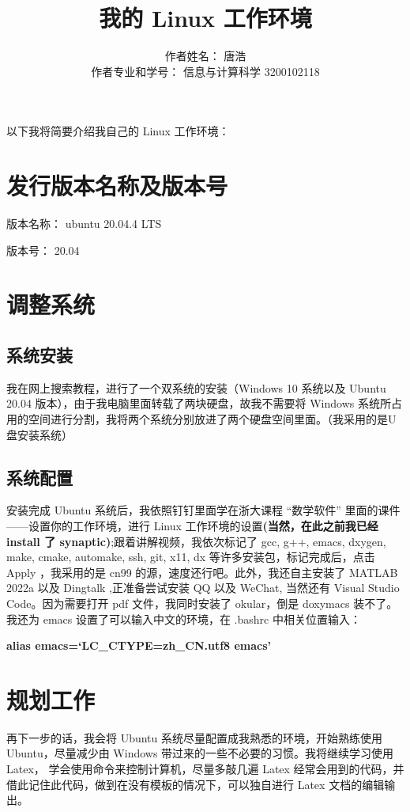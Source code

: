 \documentclass{ctexart}
\title{我的 Linux 工作环境}
\author{作者姓名： 唐浩 \\ 作者专业和学号： 信息与计算科学 3200102118}
\begin{document}
\maketitle

以下我将简要介绍我自己的 Linux 工作环境：

\section{发行版本名称及版本号}

版本名称： ubuntu 20.04.4 LTS

版本号： 20.04

\section{调整系统}

\subsection{系统安装}

我在网上搜索教程，进行了一个双系统的安装（Windows 10 系统以及 Ubuntu 20.04 版本），由于我电脑里面转载了两块硬盘，故我不需要将 Windows 系统所占用的空间进行分割，我将两个系统分别放进了两个硬盘空间里面。（我采用的是U盘安装系统）\cite{orangeye2009玩转}

\subsection{系统配置}

安装完成 Ubuntu 系统后，我依照钉钉里面学在浙大课程 ``数学软件” 里面的课件——设置你的工作环境，进行 Linux 工作环境的设置{\bf (当然，在此之前我已经 install 了 synaptic)};跟着讲解视频，我依次标记了 gcc, g++, emacs, dxygen, make, cmake, automake, ssh, git, x11, dx 等许多安装包，标记完成后，点击 Apply ，我采用的是 cn99 的源，速度还行吧。此外，我还自主安装了 MATLAB 2022a 以及 Dingtalk ,正准备尝试安装 QQ 以及 WeChat, 当然还有 Visual Studio Code。因为需要打开 pdf 文件，我同时安装了 okular，倒是 doxymacs 装不了。我还为 emacs 设置了可以输入中文的环境，在 .bashrc 中相关位置输入：

{\bf alias emacs=`LC\_CTYPE=zh\_CN.utf8 emacs' }

\section{规划工作}

再下一步的话，我会将 Ubuntu 系统尽量配置成我熟悉的环境，开始熟练使用 Ubuntu，尽量减少由 Windows 带过来的一些不必要的习惯。我将继续学习使用 Latex， 学会使用命令来控制计算机，尽量多敲几遍 Latex 经常会用到的代码，并借此记住此代码，做到在没有模板的情况下，可以独自进行 Latex 文档的编辑输出。
\end{document}
